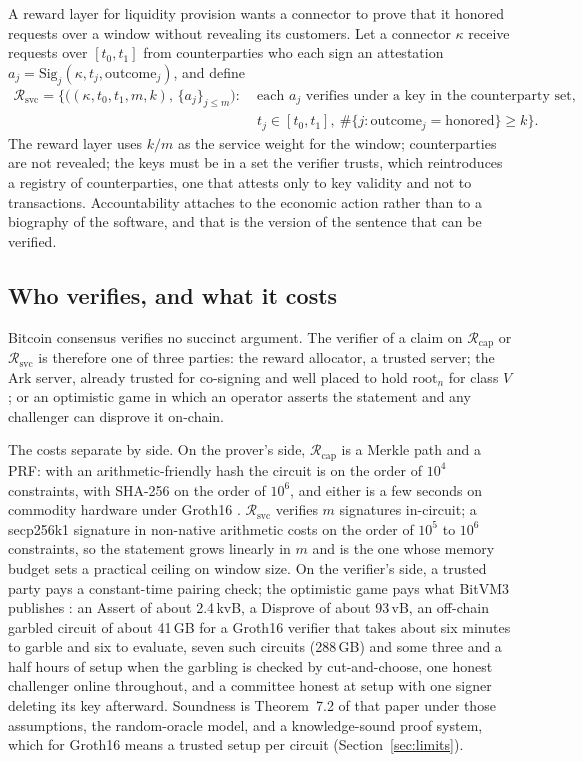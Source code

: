 \documentclass[11pt]{article}
\theoremstyle{plain}
\theoremstyle{definition}
\theoremstyle{remark}
\newcommand{\Rcap}{\mathcal{R}_{\mathrm{cap}}}
\newcommand{\Rsvc}{\mathcal{R}_{\mathrm{svc}}}
\begin{document}
A reward layer for liquidity provision wants a connector to prove that it honored requests over a window without revealing its customers. Let a connector $\kappa$ receive requests over $[t_0,t_1]$ from counterparties who each sign an attestation $a_j=\mathrm{Sig}_j(\kappa,t_j,\mathrm{outcome}_j)$, and define
\begin{equation*}
\begin{aligned}
\Rsvc=\Big\{\big((\kappa,t_0,t_1,m,k),\,\{a_j\}_{j\le m}\big):\;&
\text{each }a_j\text{ verifies under a key in the counterparty set},\\
&t_j\in[t_0,t_1],\ \#\{j:\mathrm{outcome}_j=\mathrm{honored}\}\ge k\Big\}.
\end{aligned}
\end{equation*}
The reward layer uses $k/m$ as the service weight for the window; counterparties are not revealed; the keys must be in a set the verifier trusts, which reintroduces a registry of counterparties, one that attests only to key validity and not to transactions. Accountability attaches to the economic action rather than to a biography of the software, and that is the version of the sentence that can be verified.

\subsection{Who verifies, and what it costs}
\label{sec:cost}

Bitcoin consensus verifies no succinct argument. The verifier of a claim on $\Rcap$ or $\Rsvc$ is therefore one of three parties: the reward allocator, a trusted server; the Ark server, already trusted for co-signing and well placed to hold $\mathrm{root}_n$ for class $V$; or an optimistic game in which an operator asserts the statement and any challenger can disprove it on-chain.

The costs separate by side. On the prover's side, $\Rcap$ is a Merkle path and a PRF: with an arithmetic-friendly hash the circuit is on the order of $10^4$ constraints, with SHA-256 on the order of $10^6$, and either is a few seconds on commodity hardware under Groth16 \citep{groth2016size}. $\Rsvc$ verifies $m$ signatures in-circuit; a secp256k1 signature in non-native arithmetic costs on the order of $10^5$ to $10^6$ constraints, so the statement grows linearly in $m$ and is the one whose memory budget sets a practical ceiling on window size. On the verifier's side, a trusted party pays a constant-time pairing check; the optimistic game pays what BitVM3 publishes \citep{linus2026bitvm3}: an Assert of about 2.4\,kvB, a Disprove of about 93\,vB, an off-chain garbled circuit of about 41\,GB for a Groth16 verifier that takes about six minutes to garble and six to evaluate, seven such circuits (288\,GB) and some three and a half hours of setup when the garbling is checked by cut-and-choose, one honest challenger online throughout, and a committee honest at setup with one signer deleting its key afterward. Soundness is Theorem~7.2 of that paper under those assumptions, the random-oracle model, and a knowledge-sound proof system, which for Groth16 means a trusted setup per circuit (Section~\ref{sec:limits}).
\end{document}
